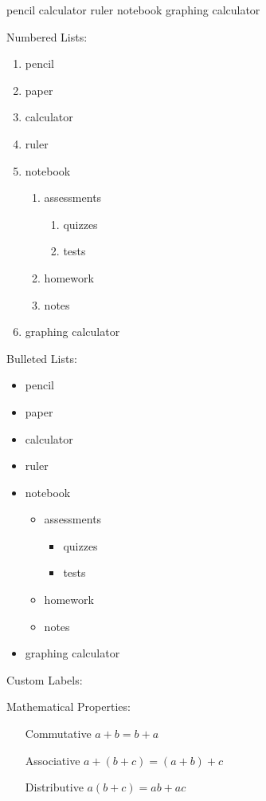 \documentclass[11pt]{article}
\begin{document}
 pencil
 calculator
 ruler
 notebook
 graphing calculator

Numbered Lists:

\begin{enumerate}
\item pencil
\item paper
\item calculator
\item ruler
\item notebook
	\begin{enumerate}
	\item assessments
		\begin{enumerate}
		\item quizzes
		\item tests
		\end{enumerate}
	\item homework
	\item notes
	\end{enumerate}
\item graphing calculator
\end{enumerate}

Bulleted Lists:

\begin{itemize}
\item pencil
\item paper
\item calculator
\item ruler
\item notebook
	\begin{itemize}
	\item assessments
		\begin{itemize}
		\item quizzes
		\item tests
		\end{itemize}
	\item homework
	\item notes
	\end{itemize}
\item graphing calculator
\end{itemize}

Custom Labels:

Mathematical Properties:
\begin{enumerate}
\item[Commutative] $a + b = b + a $
\item[Associative] $ a + (b + c) = (a + b) + c $
\item[Distributive] $ a ( b + c) = ab + ac $
\end{enumerate}
\end{document}
